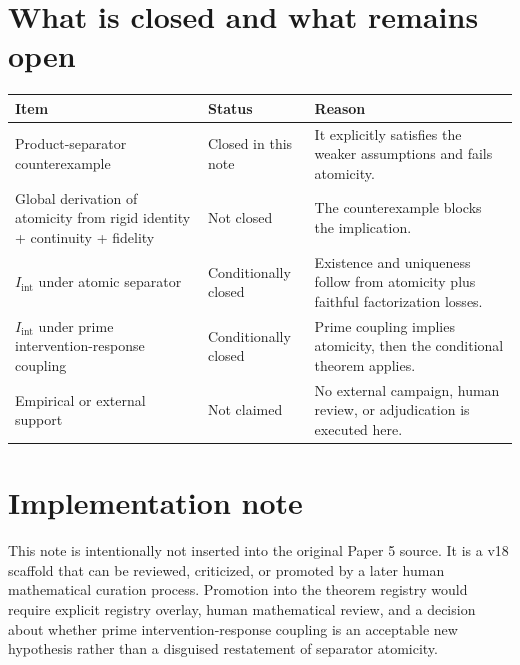 \documentclass[11pt]{article}
\newcommand{\Iint}{I_{\mathrm{int}}}
\begin{document}
\section{What is closed and what remains open}

\begin{longtable}{p{}p{}p{}}
\toprule
Item & Status & Reason \\
\midrule
Product-separator counterexample & Closed in this note & It explicitly satisfies the weaker assumptions and fails atomicity. \\
Global derivation of atomicity from rigid identity + continuity + fidelity & Not closed & The counterexample blocks the implication. \\
$\Iint$ under atomic separator & Conditionally closed & Existence and uniqueness follow from atomicity plus faithful factorization losses. \\
$\Iint$ under prime intervention-response coupling & Conditionally closed & Prime coupling implies atomicity, then the conditional theorem applies. \\
Empirical or external support & Not claimed & No external campaign, human review, or adjudication is executed here. \\
\bottomrule
\end{longtable}

\section{Implementation note}
This note is intentionally not inserted into the original Paper 5 source. It is a v18 scaffold that can be reviewed, criticized, or promoted by a later human mathematical curation process. Promotion into the theorem registry would require explicit registry overlay, human mathematical review, and a decision about whether prime intervention-response coupling is an acceptable new hypothesis rather than a disguised restatement of separator atomicity.
\end{document}
